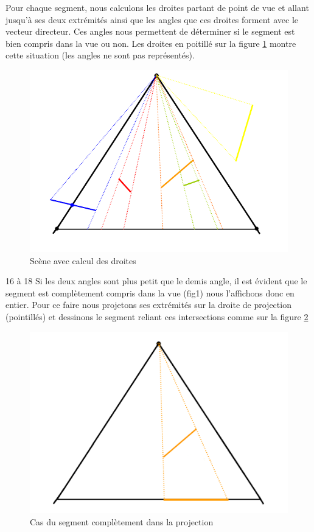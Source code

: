 \documentclass[11pt,a4paper]{article}
\theoremstyle{definition}
\theoremstyle{remark}
\begin{document}
Pour chaque segment, nous calculons les droites partant de point de vue et allant jusqu'à ses deux extrémités ainsi que les angles que ces droites forment avec le vecteur directeur. Ces angles nous permettent de déterminer si le segment est bien compris dans la vue ou non. Les droites en poitillé sur la figure \ref{exp_3} montre cette situation (les angles ne sont pas représentés).

\begin{figure}[H]
\centering
\includegraphics[scale=0.6]{inter.png}
\caption{Scène avec calcul des droites}
\label{exp_3}
\end{figure}

16 à 18 
Si les deux angles sont plus petit que le demis angle, il est évident que le segment est complètement compris dans la vue (fig1) nous l'affichons donc en entier. Pour ce faire nous projetons ses extrémités sur la droite de projection (pointillés) et dessinons le segment reliant ces intersections comme sur la figure \ref{cas1}

\begin{figure}[H]
\centering
\includegraphics[scale=0.6]{cas1.png}
\caption{Cas du segment complètement dans la projection}
\label{cas1}
\end{figure}
\end{document}
